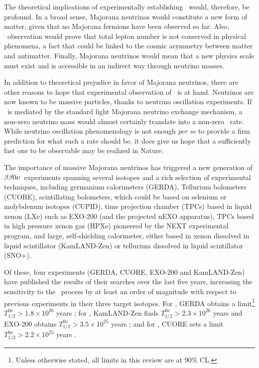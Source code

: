 The theoretical implications of experimentally establishing \bbonu\ would, therefore, be profound. In a broad sense, Majorana neutrinos would constitute a new form of matter, given that no Majorana fermions have been observed so far. Also, \bbonu\ observation would prove that total lepton number is not conserved in physical phenomena, a fact that could be linked to the cosmic asymmetry between matter and antimatter.  Finally, Majorana neutrinos would mean that a new physics scale must exist and is accessible in an indirect way through neutrino masses. 

In addition to theoretical prejudice in favor of Majorana neutrinos, there are other reasons to hope that experimental observation of \bbonu\ is at hand. Neutrinos are now known to be massive particles, thanks to neutrino oscillation experiments. If \bbonu\ is mediated by the standard light Majorana neutrino exchange mechanism, a non-zero neutrino mass would almost certainly translate into a non-zero \bbonu\ rate. While neutrino oscillation phenomenology is not enough \emph{per se} to provide a firm prediction for what such a rate should be, it does give us hope that a sufficiently fast one to be observable may be realized in Nature. 

The importance of massive Majorana neutrinos 
has triggered a new generation of $\beta\beta0\nu$~experiments spanning several isotopes and a rich selection of experimental techniques, including germanium calorimeters (GERDA), Tellurium bolometers (CUORE), scintillating bolometers, which could be based on selenium or molybdenum isotopes (CUPID),  time projection chamber (TPCs) based in liquid xenon (LXe) such as EXO-200 (and the projected nEXO apparatus), TPCs based in high pressure xenon gas (HPXe) pioneered by the NEXT experimental program, and large, self-shielding calorimeter, either based in xenon dissolved in liquid scintillator (KamLAND-Zen) or tellurium dissolved in liquid scintillator (SNO+). 

Of these, four experiments (GERDA, CUORE, EXO-200 and KamLAND-Zen) have published the results of their searches over the last five years, increasing the sensitivity to the \bbonu\ process by at least an order of magnitude with respect to previous experiments in their three target isotopes. 
For , GERDA obtains a limit\footnote{Unless otherwise stated, all limits in this review are at 90\% CL.} \mbox{$T^{0\nu}_{1/2} > 1.8 \times 10^{26}$} years \cite{GERDA:2020xhi};  
for , KamLAND-Zen finds \mbox{$T^{0\nu}_{1/2} > 2.3 \times 10^{26}$} years  \cite{KamLAND-Zen:2022tow} and EXO-200 obtains \mbox{$T^{0\nu}_{1/2} > 3.5 \times 10^{25}$} years \cite{EXO-200:2019rkq}; and for 
 , CUORE sets a limit \mbox{$T^{0\nu}_{1/2} > 2.2 \times 10^{25}$} years  \cite{CUORE:2021mvw}. 
 
